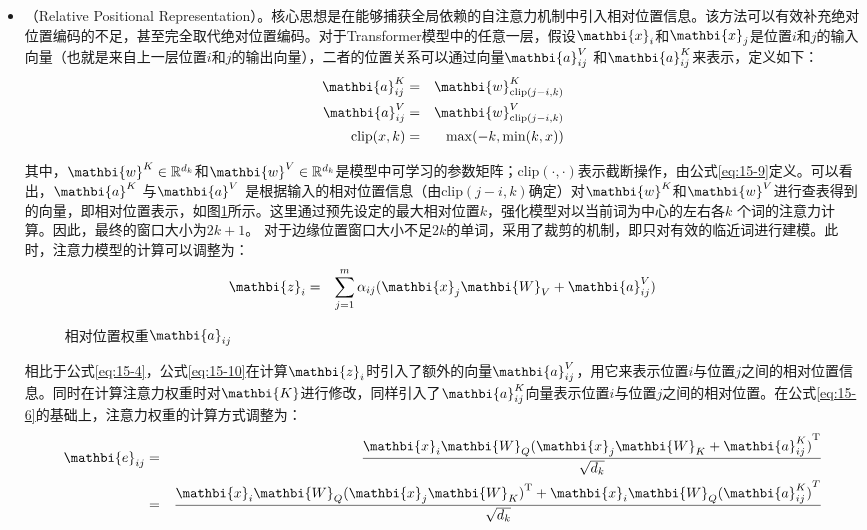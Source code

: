 \begin{itemize}
\vspace{0.5em}
\item {\small{}}（Relative Positional Representation）。核心思想是在能够捕获全局依赖的自注意力机制中引入相对位置信息。该方法可以有效补充绝对位置编码的不足，甚至完全取代绝对位置编码。对于Transformer模型中的任意一层，假设$\mathbi{x}_i$和$\mathbi{x}_j$是位置$i$和$j$的输入向量（也就是来自上一层位置$i$和$j$的输出向量），二者的位置关系可以通过向量$\mathbi{a}_{ij}^V$ 和$\mathbi{a}_{ij}^K$来表示，定义如下：
\begin{eqnarray}
\mathbi{a}_{ij}^K &=& \mathbi{w}^K_{\textrm{clip}(j-i,k)} \label{eq:15-7} \\
\mathbi{a}_{ij}^V &=& \mathbi{w}^V_{\textrm{clip}(j-i,k)} \label{eq:15-8} \\
\textrm{clip}(x,k) &=& \max(-k,\min(k,x)) 
\label{eq:15-9}
\end{eqnarray}

\noindent 其中，$\mathbi{w}^K \in \mathbb{R}^{d_k}$和$\mathbi{w}^V \in \mathbb{R}^{d_k}$是模型中可学习的参数矩阵；$\textrm{clip}(\cdot,\cdot)$表示截断操作，由公式\eqref{eq:15-9}定义。可以看出，$\mathbi{a}^K$ 与$\mathbi{a}^V$ 是根据输入的相对位置信息（由$\textrm{clip}(j-i,k)$确定）对$\mathbi{w}^K$和$\mathbi{w}^V$进行查表得到的向量，即相对位置表示，如图\ref{fig:15-2}所示。这里通过预先设定的最大相对位置$k$，强化模型对以当前词为中心的左右各$k$ 个词的注意力计算。因此，最终的窗口大小为$2k + 1$。 对于边缘位置窗口大小不足$2k$的单词，采用了裁剪的机制，即只对有效的临近词进行建模。此时，注意力模型的计算可以调整为：
\begin{eqnarray}
\mathbi{z}_{i} &=& \sum_{j=1}^m \alpha_{ij}(\mathbi{x}_j \mathbi{W}_V + \mathbi{a}_{ij}^V)
\label{eq:15-10}
\end{eqnarray}

\begin{figure}[htp]
\centering
\vspace{-1em}

\caption{相对位置权重$\mathbi{a}_{ij}$}
\setlength{\belowcaptionskip}{-2em}
\label{fig:15-2}
\end{figure}

\noindent 相比于公式\eqref{eq:15-4}，公式\eqref{eq:15-10}在计算$\mathbi{z}_i$时引入了额外的向量$\mathbi{a}_{ij}^V$，用它来表示位置$i$与位置$j$之间的相对位置信息。同时在计算注意力权重时对$\mathbi{K}$进行修改，同样引入了$\mathbi{a}_{ij}^K$向量表示位置$i$与位置$j$之间的相对位置。在公式\eqref{eq:15-6}的基础上，注意力权重的计算方式调整为：
\begin{eqnarray}
\mathbi{e}_{ij} &=& \frac{\mathbi{x}_i \mathbi{W}_Q{(\mathbi{x}_j \mathbi{W}_K + \mathbi{a}_{ij}^K )}^{\textrm{T}}}{\sqrt{d_k}} \nonumber \\
&=& \frac{\mathbi{x}_i \mathbi{W}_Q{(\mathbi{x}_j \mathbi{W}_K)}^{\textrm{T}} + \mathbi{x}_i \mathbi{W}_Q{(\mathbi{a}_{ij}^K )}^{T}}{\sqrt{d_k}}
\label{eq:15-11}
\end{eqnarray}


\end{itemize}
